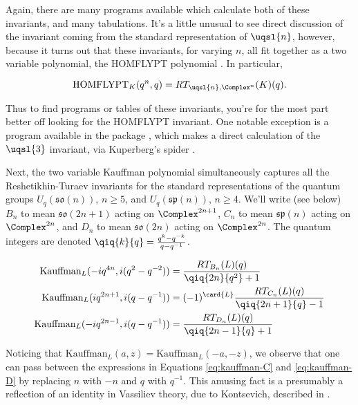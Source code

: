 Again, there are many programs available which calculate both of these
invariants, and many tabulations. It's a little unusual to see direct
discussion of the invariant coming from the standard representation of
$\uqsl{n}$, however, because it turns out that these invariants, for
varying $n$, all fit together as a two variable polynomial, the HOMFLYPT
polynomial \cite{MR776477}. In particular,

$$\text{HOMFLYPT}_K(q^n, q) = RT_{\uqsl{n}, \Complex^n}(K)(q).$$

Thus to find programs or tables of these invariants, you're for the most
part better off looking for the HOMFLYPT invariant. One notable exception
is a program available in the  \MMA package \cite{???},
which makes a direct calculation of the $\uqsl{3}$ invariant, via
Kuperberg's spider \cite{???}.

Next, the two variable Kauffman polynomial \cite{MR958895} simultaneously
captures all the Reshetikhin-Turaev invariants for the standard
representations of the quantum groups $U_q(\mathfrak{so}(n))$, $n \geq
5$, and $U_q(\mathfrak{sp}(n))$, $n \geq 4$. We'll write (see below)
$B_n$ to mean $\mathfrak{so}(2n+1)$ acting on $\Complex^{2n+1}$, $C_n$ to
mean $\mathfrak{sp}(n)$ acting on $\Complex^{2n}$, and $D_n$ to mean
$\mathfrak{so}(2n)$ acting on $\Complex^{2n}$. The quantum integers are
denoted $\qiq{k}{q} = \frac{q^k-q^{-k}}{q-q^{-1}}$.

\begin{align}
\label{eq:kauffman-B}%
\text{Kauffman}_L(-i q^{4n}, i (q^2-q^{-2})) & = \frac{RT_{B_n}(L)(q)}{\qiq{2n}{q^2} + 1} \\
\label{eq:kauffman-C}%
\text{Kauffman}_L(i q^{2n+1}, i (q-q^{-1})) & = (-1)^{\card{L}} \frac{RT_{C_n}(L)(q)}{\qiq{2n+1}{q} - 1} \\
\label{eq:kauffman-D}%
\text{Kauffman}_L(-i q^{2n-1}, i (q-q^{-1})) & = \frac{RT_{D_n}(L)(q)}{\qiq{2n-1}{q} + 1}
\end{align}

 

Noticing that $\text{Kauffman}_L(a,z) = \text{Kauffman}_L(-a,-z)$, we
observe that one can pass between the expressions in Equations
\ref{eq:kauffman-C} and \ref{eq:kauffman-D} by replacing $n$ with $-n$
and $q$ with $q^{-1}$. This amusing fact is a presumably a reflection of
an identity in Vassiliev theory, due to Kontsevich, described in
\cite[Exercise 6.37]{MR1318886}.

